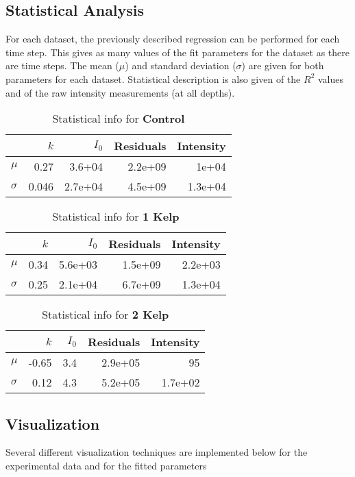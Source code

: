 \subsection{Statistical Analysis}
\label{stats}
For each dataset, the previously described regression can be performed for each time step. This gives as many values of the fit parameters for the dataset as there are time steps. The mean ($\mu$) and standard deviation ($\sigma$) are given for both parameters for each dataset. Statistical description is also given of the $R^2$ values and of the raw intensity measurements (at all depths). \\

\begin{table}[H]
	\centering
	\begin{tabular}{lrrrr}
		\toprule
		&  $k$ & $I_0$ & Residuals & Intensity\\
		\midrule
		$\mu$ & 0.27 & 3.6+04 & 2.2e+09 & 1e+04 \\
		$\sigma$ & 0.046 & 2.7e+04 & 4.5e+09 & 1.3e+04 \\
	\end{tabular}
	\caption{Statistical info for \textbf{Control}}
	\label{stats_control}
\end{table}

\begin{table}[H]
	\centering
	\begin{tabular}{lrrrr}
		\toprule
		&  $k$ & $I_0$ & Residuals & Intensity\\
		\midrule
		$\mu$ & 0.34 & 5.6e+03 & 1.5e+09 & 2.2e+03 \\
		$\sigma$ & 0.25 & 2.1e+04 & 6.7e+09 & 1.3e+04 \\
	\end{tabular}
	\caption{Statistical info for \textbf{1 Kelp}}
	\label{stats_1_kelp}
\end{table}

\begin{table}[H]
	\centering
	\begin{tabular}{lrrrr}
		\toprule
		&  $k$ & $I_0$ & Residuals & Intensity\\
		\midrule
		$\mu$ & -0.65 & 3.4 & 2.9e+05 & 95 \\
		$\sigma$ & 0.12 & 4.3 & 5.2e+05 & 1.7e+02 \\
	\end{tabular}
	\caption{Statistical info for \textbf{2 Kelp}}
	\label{stats_2_kelp}
\end{table}
	
\pagebreak
\subsection{Visualization}
Several different visualization techniques are implemented below for the experimental data and for the fitted parameters

